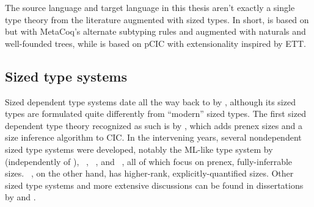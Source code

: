 The source language \lang and target language \CICE in this thesis aren't exactly
a single type theory from the literature augmented with sized types.
In short, \lang is based on \GCC but with MetaCoq's alternate subtyping rules
and augmented with naturals and well-founded trees,
while \CICE is based on pCIC with extensionality inspired by ETT.

\subsection{Sized type systems}

Sized dependent type systems date all the way back to \CCR by \citet{CCR},
although its sized types are formulated quite differently from ``modern'' sized types.
The first sized dependent type theory recognized as such is \CIChat by \citet{CIC-hat},
which adds prenex sizes
and a size inference algorithm to CIC.
In the intervening years, several nondependent sized type systems were developed,
notably the ML-like type system by \citet{hughes} (independently of \CCR),
\lambdahat~\citep{lambda-hat, lambda-hat-diss},
\Fhat~\citep{F-hat}, and
\Fhattimes~\citep{F-hat-times},
all of which focus on prenex, fully-inferrable sizes.
\Fhatomega~\citep{Abel-diss}, on the other hand,
has higher-rank, explicitly-quantified sizes.
Other sized type systems and more extensive discussions can be found in dissertations by
\citet{lambda-hat-diss} and \citet{Abel-diss}.

